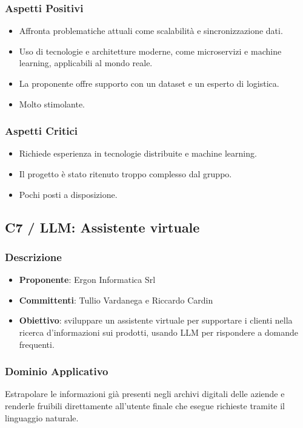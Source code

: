 \documentclass[a4paper, 12pt]{article}
\begin{document}
\subsubsection{Aspetti Positivi}
\begin{itemize}
    \item Affronta problematiche attuali come scalabilità e sincronizzazione dati.
    \item Uso di tecnologie e architetture moderne, come microservizi e machine learning, applicabili al mondo reale.
    \item La proponente offre supporto con un dataset e un esperto di logistica.
    \item Molto stimolante.
\end{itemize}

\subsubsection{Aspetti Critici}
\begin{itemize}
    \item Richiede esperienza in tecnologie distribuite e machine learning.
    \item Il progetto è stato ritenuto troppo complesso dal gruppo.
    \item Pochi posti a disposizione.
\end{itemize}

\subsection{C7 / LLM: Assistente virtuale}

\subsubsection{Descrizione}
\begin{itemize}
    \item \textbf{Proponente}: Ergon Informatica Srl
    \item \textbf{Committenti}: Tullio Vardanega e Riccardo Cardin
    \item \textbf{Obiettivo}: sviluppare un assistente virtuale per supportare i clienti nella ricerca d'informazioni sui prodotti, usando LLM per rispondere a domande frequenti.
\end{itemize}

\subsubsection{Dominio Applicativo}
Estrapolare le informazioni già presenti negli archivi digitali delle aziende e renderle fruibili direttamente all’utente finale che esegue richieste tramite il linguaggio naturale.
\end{document}
